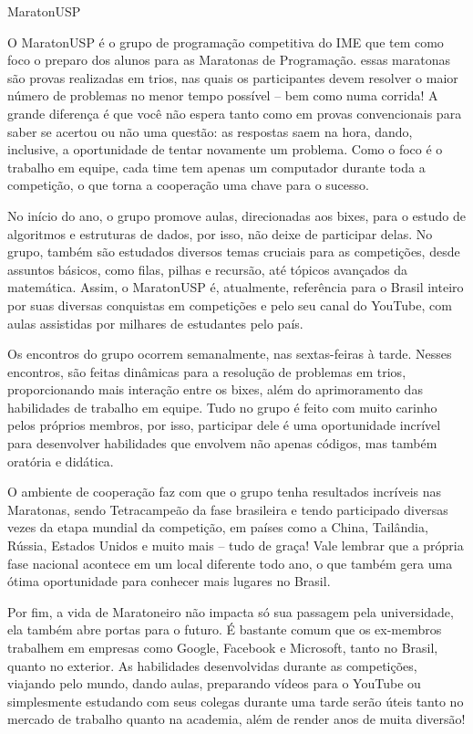 \begin{subsecao}{MaratonUSP}


O MaratonUSP é o grupo de programação competitiva do IME que tem como foco o
preparo dos alunos para as Maratonas de Programação. essas maratonas são provas
realizadas em trios, nas quais os participantes devem resolver o maior número
de problemas no menor tempo possível -- bem como numa corrida! A grande
diferença é que você não espera tanto como em provas convencionais para saber
se acertou ou não uma questão: as respostas saem na hora, dando, inclusive, a
oportunidade de tentar novamente um problema. Como o foco é o trabalho em
equipe, cada time tem apenas um computador durante toda a competição, o que
torna a cooperação uma chave para o sucesso.

No início do ano, o grupo promove aulas, direcionadas aos bixes, 
para o estudo de algoritmos e estruturas de dados, por isso, não deixe de
participar delas. No grupo, também são estudados diversos temas cruciais para
as competições, desde assuntos básicos, como filas, pilhas e recursão, até tópicos
avançados da matemática. Assim, o MaratonUSP é, atualmente, referência para o
Brasil inteiro por suas diversas conquistas em competições e pelo seu canal do
YouTube, com aulas assistidas por milhares de estudantes pelo país.

Os encontros do grupo ocorrem semanalmente, nas sextas-feiras à tarde. Nesses
encontros, são feitas dinâmicas para a resolução de problemas em trios,
proporcionando mais interação entre os bixes, além do aprimoramento das habilidades
de trabalho em equipe. Tudo no grupo é feito com muito carinho pelos próprios
membros, por isso, participar dele é uma oportunidade incrível para desenvolver
habilidades que envolvem não apenas códigos, mas também oratória e didática.

O ambiente de cooperação faz com que o grupo tenha resultados incríveis nas
Maratonas, sendo Tetracampeão da fase brasileira e tendo participado diversas
vezes da etapa mundial da competição, em países como a China, Tailândia,
Rússia, Estados Unidos e muito mais -- tudo de graça! Vale lembrar que a própria
fase nacional acontece em um local diferente todo ano, o que também gera uma ótima
oportunidade para conhecer mais lugares no Brasil.

Por fim, a vida de Maratoneiro não impacta só sua passagem pela universidade,
ela também abre portas para o futuro. É bastante comum que os ex-membros
trabalhem em empresas como Google, Facebook e Microsoft, tanto no Brasil,
quanto no exterior. As habilidades desenvolvidas durante as competições,
viajando pelo mundo, dando aulas, preparando vídeos para o YouTube ou
simplesmente estudando com seus colegas durante uma tarde serão úteis tanto no
mercado de trabalho quanto na academia, além de render anos de muita diversão!


\end{subsecao}
